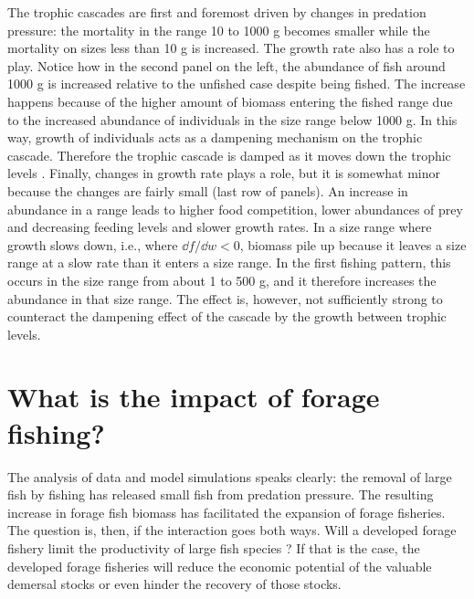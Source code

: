 The trophic cascades are first and foremost driven by changes in predation pressure: the mortality in the range 10 to 1000 g becomes smaller while the mortality on sizes less than 10 g is increased.  The growth rate also has a role to play.  Notice how in the second panel on the left, the abundance of fish around 1000 g is increased relative to the unfished case despite being fished.  The increase happens because of the higher amount of biomass entering the fished range due to the increased abundance of individuals in the size range below 1000 g.  In this way, growth of individuals acts as a dampening mechanism on the trophic cascade.  Therefore the trophic cascade is damped as it moves down the trophic levels \citep{Andersen2010}.  Finally, changes in growth rate plays a role, but it is somewhat minor because the changes are fairly small (last row of panels).  An increase in abundance in a range leads to higher food competition, lower abundances of prey and decreasing feeding levels and slower growth rates.  In a size range where growth slows down, i.e., where $\dd f/\dd w < 0$, biomass pile up because it leaves a size range at a slow rate than it enters a size range.  In the first fishing pattern, this occurs in the size range from about 1 to 500 g, and it therefore increases the abundance in that size range.  The effect is, however, not sufficiently strong to counteract the dampening effect of the cascade by the growth between trophic levels. 





\section{What is the impact of forage fishing?}%
The analysis of data and model simulations speaks clearly: the removal of large fish by fishing has released small fish from predation pressure.  The resulting increase in forage fish biomass has facilitated the expansion of forage fisheries.  The question is, then, if the interaction goes both ways.  Will a developed forage fishery limit the productivity of large fish species \citep{Houle2013, Ravn-Jonsen2016}?  If that is the case, the developed forage fisheries will reduce the economic potential of the valuable demersal stocks or even hinder the recovery of those stocks.

